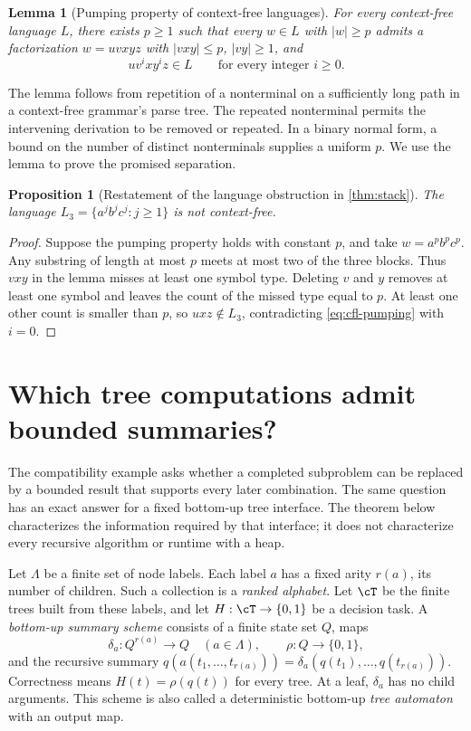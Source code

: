 \documentclass[11pt,twoside]{article}
\newtheorem{proposition}[theorem]{Proposition}
\newtheorem{lemma}[theorem]{Lemma}
\theoremstyle{definition}
\theoremstyle{remark}
\begin{document}
\begin{lemma}[Pumping property of context-free languages]
\label{lem:cfl-pumping}
For every context-free language $L$, there exists $p\geq1$ such that every
$w\in L$ with $|w|\geq p$ admits a factorization $w=uvxyz$ with
$|vxy|\leq p$, $|vy|\geq1$, and
\begin{equation}
 uv^i xy^i z\in L\qquad\text{for every integer }i\geq0.
 \label{eq:cfl-pumping}
\end{equation}
\end{lemma}

The lemma follows from repetition of a nonterminal on a sufficiently long
path in a context-free grammar's parse tree. The repeated nonterminal permits
the intervening derivation to be removed or repeated. In a binary normal
form, a bound on the number of distinct nonterminals supplies a uniform
$p$. We use the lemma to prove the promised separation.

\begin{proposition}[Restatement of the language obstruction in \cref{thm:stack}]
The language $L_3=\{a^j b^j c^j:j\geq1\}$ is not context-free.
\end{proposition}
\begin{proof}
Suppose the pumping property holds with constant $p$, and take
$w=a^p b^p c^p$. Any substring of length at most $p$ meets at most two of
the three blocks. Thus $vxy$ in the lemma misses at least one symbol type.
Deleting $v$ and $y$ removes at least one symbol and leaves the count of
the missed type equal to $p$. At least one other count is smaller than
$p$, so $uxz\notin L_3$, contradicting \eqref{eq:cfl-pumping} with $i=0$.
\end{proof}

\section{Which tree computations admit bounded summaries?}
\label{app:trees}

The compatibility example asks whether a completed subproblem can be
replaced by a bounded result that supports every later combination. The
same question has an exact answer for a fixed bottom-up tree interface.
The theorem below characterizes the information required by that interface;
it does not characterize every recursive algorithm or runtime with a heap.

Let $\Lambda$ be a finite set of node labels. Each label $a$ has a fixed
arity $r(a)$, its number of children. Such a collection is a
\emph{ranked alphabet}. Let $\cT$ be the finite trees built from these
labels, and let $H:\cT\to\{0,1\}$ be a decision task. A
\emph{bottom-up summary scheme} consists of a finite state set $Q$, maps
\begin{equation}
 \delta_a:Q^{r(a)}\to Q\quad(a\in\Lambda),\qquad
 \rho:Q\to\{0,1\},
 \label{eq:tree-scheme}
\end{equation}
and the recursive summary
$q(a(t_1,\ldots,t_{r(a)}))=\delta_a(q(t_1),\ldots,q(t_{r(a)}))$.
Correctness means $H(t)=\rho(q(t))$ for every tree. At a leaf,
$\delta_a$ has no child arguments. This scheme is also called a
deterministic bottom-up \emph{tree automaton} with an output map.
\end{document}
